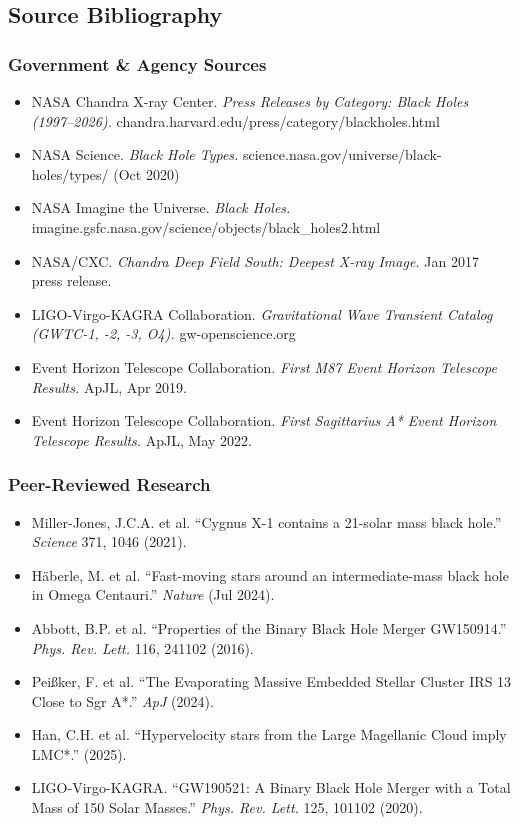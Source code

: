 \documentclass[11pt,letterpaper]{article}
\begin{document}
\subsection{Source Bibliography}

\subsubsection{Government \& Agency Sources}

\begin{itemize}[leftmargin=1.5em]
  \item NASA Chandra X-ray Center. \textit{Press Releases by Category: Black Holes (1997--2026).} chandra.harvard.edu/press/category/blackholes.html
  \item NASA Science. \textit{Black Hole Types.} science.nasa.gov/universe/black-holes/types/ (Oct 2020)
  \item NASA Imagine the Universe. \textit{Black Holes.} imagine.gsfc.nasa.gov/science/objects/black\_holes2.html
  \item NASA/CXC. \textit{Chandra Deep Field South: Deepest X-ray Image.} Jan 2017 press release.
  \item LIGO-Virgo-KAGRA Collaboration. \textit{Gravitational Wave Transient Catalog (GWTC-1, -2, -3, O4).} gw-openscience.org
  \item Event Horizon Telescope Collaboration. \textit{First M87 Event Horizon Telescope Results.} ApJL, Apr 2019.
  \item Event Horizon Telescope Collaboration. \textit{First Sagittarius A* Event Horizon Telescope Results.} ApJL, May 2022.
\end{itemize}

\subsubsection{Peer-Reviewed Research}

\begin{itemize}[leftmargin=1.5em]
  \item Miller-Jones, J.C.A. et al. ``Cygnus X-1 contains a 21-solar mass black hole.'' \textit{Science} 371, 1046 (2021).
  \item Häberle, M. et al. ``Fast-moving stars around an intermediate-mass black hole in Omega Centauri.'' \textit{Nature} (Jul 2024).
  \item Abbott, B.P. et al. ``Properties of the Binary Black Hole Merger GW150914.'' \textit{Phys. Rev. Lett.} 116, 241102 (2016).
  \item Peißker, F. et al. ``The Evaporating Massive Embedded Stellar Cluster IRS 13 Close to Sgr A*.'' \textit{ApJ} (2024).
  \item Han, C.H. et al. ``Hypervelocity stars from the Large Magellanic Cloud imply LMC*.'' (2025).
  \item LIGO-Virgo-KAGRA. ``GW190521: A Binary Black Hole Merger with a Total Mass of 150 Solar Masses.'' \textit{Phys. Rev. Lett.} 125, 101102 (2020).
\end{itemize}
\end{document}
